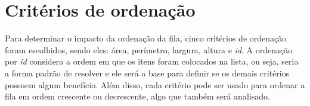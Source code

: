 \section{Critérios de ordenação}\label{sec:criterios-de-ordenacao}

Para determinar o impacto da ordenação da fila, cinco critérios de ordenação
foram escolhidos, sendo eles: área, perímetro, largura, altura e \textit{id}.
A ordenação por \textit{id} considera a ordem em que os itens foram colocados na lista, ou seja,
seria a forma padrão de resolver e ele será a base para definir se os demais critérios possuem
algum benefício.
Além disso, cada critério pode ser usado para ordenar a fila em ordem crescente ou decrescente,
algo que também será analisado.

